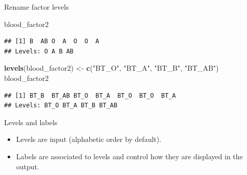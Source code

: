 \documentclass[ignorenonframetext,]{beamer}
\newenvironment{Shaded}{\begin{snugshade}}{\end{snugshade}}
\newcommand{\KeywordTok}[1]{\textcolor[rgb]{0.13,0.29,0.53}{\textbf{#1}}}
\newcommand{\NormalTok}[1]{#1}
\newcommand{\StringTok}[1]{\textcolor[rgb]{0.31,0.60,0.02}{#1}}
\providecommand{\tightlist}{%
  \setlength{\itemsep}{0pt}\setlength{\parskip}{0pt}}
\begin{document}
\begin{frame}[fragile]{Rename factor levels}
\protect\hypertarget{rename-factor-levels}{}

\begin{Shaded}
\begin{Highlighting}[]
\NormalTok{blood_factor2 }
\end{Highlighting}
\end{Shaded}

\begin{verbatim}
## [1] B  AB O  A  O  O  A 
## Levels: O A B AB
\end{verbatim}

\begin{Shaded}
\begin{Highlighting}[]
\KeywordTok{levels}\NormalTok{(blood_factor2) <-}\StringTok{ }\KeywordTok{c}\NormalTok{(}\StringTok{"BT_O"}\NormalTok{, }\StringTok{"BT_A"}\NormalTok{, }\StringTok{"BT_B"}\NormalTok{,}
                           \StringTok{"BT_AB"}\NormalTok{)}
\NormalTok{blood_factor2}
\end{Highlighting}
\end{Shaded}

\begin{verbatim}
## [1] BT_B  BT_AB BT_O  BT_A  BT_O  BT_O  BT_A 
## Levels: BT_O BT_A BT_B BT_AB
\end{verbatim}

\end{frame}

\begin{frame}{Levels and labels}
\protect\hypertarget{levels-and-labels}{}

\begin{itemize}
\tightlist
\item
  Levels are input (alphabetic order by default).
\item
  Labels are associated to levels and control how they are displayed in
  the output.
\end{itemize}

\end{frame}
\end{document}
